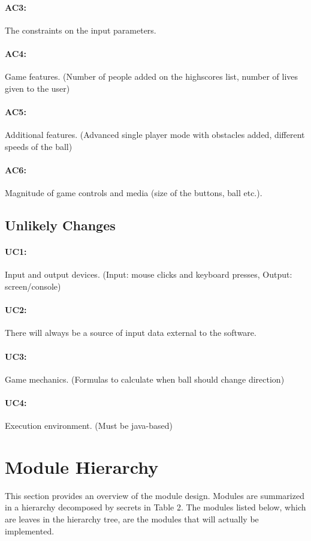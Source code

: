 \documentclass[12pt,letterpaper]{article}
\begin{document}
	\paragraph{AC3:}	The constraints on the input parameters.
	\paragraph{AC4:}	Game features. (Number of people added on the highscores list, number of lives given to the user)
	\paragraph{AC5:}	Additional features. (Advanced single player mode with obstacles added, different speeds of the ball)
	\paragraph{AC6:}	Magnitude of game controls and media (size of the buttons, ball etc.).
	
	\subsection{Unlikely Changes}
	\paragraph{UC1:}	Input and output devices. (Input: mouse clicks and keyboard presses, Output: screen/console)
	\paragraph{UC2:}	There will always be a source of input data external to the software.
	\paragraph{UC3:}	Game mechanics. (Formulas to calculate when ball should change direction) 
	\paragraph{UC4:}	Execution environment. (Must be java-based)

	\section{Module Hierarchy}
	This section provides an overview of the module design. Modules are summarized in a hierarchy decomposed by secrets in Table 2. The modules listed below, which are leaves in the hierarchy tree, are the modules that will actually be implemented.
\end{document}
